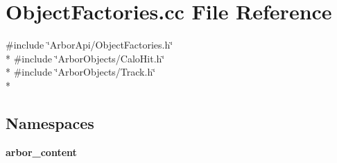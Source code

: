 \section{Object\+Factories.\+cc File Reference}
\label{ObjectFactories_8cc}
{\ttfamily \#include \char`\"{}Arbor\+Api/\+Object\+Factories.\+h\char`\"{}}\\*
{\ttfamily \#include \char`\"{}Arbor\+Objects/\+Calo\+Hit.\+h\char`\"{}}\\*
{\ttfamily \#include \char`\"{}Arbor\+Objects/\+Track.\+h\char`\"{}}\\*
\subsection*{Namespaces}
\begin{DoxyCompactItemize}
\item 
 {\bf arbor\+\_\+content}
\end{DoxyCompactItemize}
